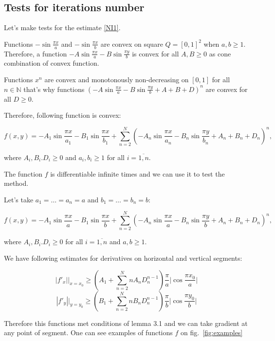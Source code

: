\documentclass[12pt]{article}
\begin{document}
\subsection{Tests for iterations number}

Let's make tests for the estimate \eqref{NI1}.

Functions $-\sin\frac{\pi x}{a}$ and $-\sin\frac{\pi x}{b}$ are convex on square $Q = [0,1]^2$ when $a,b\geq 1$. Therefore, a function $-A\sin\frac{\pi x}{a} - B\sin\frac{\pi y}{b}$ is convex for all $A,B\geq 0$ as cone combination of convex function.

Functions $x^n$ are convex and monotonously non-decreasing on $[0, 1]$ for all $n \in \mathbb{N}$ that's why functions $\left(-A\sin\frac{\pi x}{a} - B\sin\frac{\pi y}{b} + A + B + D\right)^n$ are convex for all $D\geq 0$.

Therefore, following function is convex:

$$f(x,y) = -A_1\sin\frac{\pi x}{a_1} - B_1\sin\frac{\pi x}{b_1} + \sum\limits_{n=2}^N\left(-A_n\sin\frac{\pi x}{a_n} - B_n\sin\frac{\pi y}{b_n} + A_n + B_n + D_n\right)^n,$$

where $A_i, B_i. D_i\geq 0$ and $a_i, b_i \geq 1$ for all $i = \overline{1, n}$.

The function $f$ is differentiable infinite times and we can use it to test the method.

Let's take $a_1 = \dots = a_n = a$ and $b_1 = \dots = b_n = b$:

$$f(x,y) = -A_1\sin\frac{\pi x}{a} - B_1\sin\frac{\pi x}{b} + \sum\limits_{n=2}^N\left(-A_n\sin\frac{\pi x}{a} - B_n\sin\frac{\pi y}{b} + A_n + B_n + D_n\right)^n,$$

where $A_i, B_i. D_i\geq 0$ for all $i = \overline{1, n}$ and $a, b \geq 1$.

We have following estimates for derivatives on horizontal and vertical segments:

$$|f'_x|\Big|_{x = x_0} \geq \left(A_1 + \sum\limits_{n=2}^N n A_n D_n^{n-1}\right)\frac{\pi}{a}\Big|\cos \frac{\pi x_0}{a}\Big|$$
$$|f'_y|\Big|_{y = y_0} \geq \left(B_1 + \sum\limits_{n=2}^N n B_n D_n^{n-1}\right)\frac{\pi}{b}\Big|\cos \frac{\pi y_0}{b}\Big|$$

Therefore this functions met conditions of lemma 3.1 and we can take gradient at any point of segment. One can see examples of functions $f$ on fig.~\ref{fig:examples}
\end{document}
